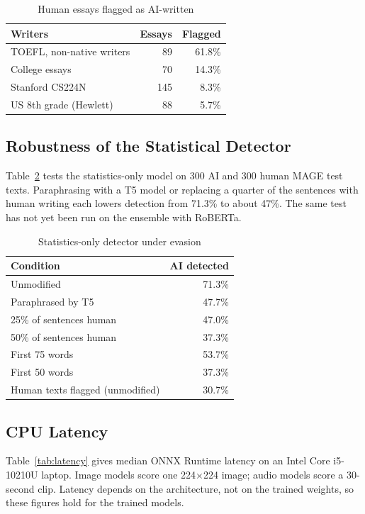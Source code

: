 \documentclass[conference]{IEEEtran}
\begin{document}
\begin{table}[t]
\centering
\caption{Human essays flagged as AI-written}
\label{tab:bias}
\begin{tabular}{lrr}
\toprule
\textbf{Writers} & \textbf{Essays} & \textbf{Flagged} \\
\midrule
TOEFL, non-native writers & 89 & 61.8\% \\
College essays & 70 & 14.3\% \\
Stanford CS224N & 145 & 8.3\% \\
US 8th grade (Hewlett) & 88 & 5.7\% \\
\bottomrule
\end{tabular}
\end{table}

\subsection{Robustness of the Statistical Detector}
Table~\ref{tab:robust} tests the statistics-only model on 300 AI and 300 human MAGE test texts. Paraphrasing with a T5 model or replacing a quarter of the sentences with human writing each lowers detection from 71.3\% to about 47\%. The same test has not yet been run on the ensemble with RoBERTa.

\begin{table}[t]
\centering
\caption{Statistics-only detector under evasion}
\label{tab:robust}
\begin{tabular}{lr}
\toprule
\textbf{Condition} & \textbf{AI detected} \\
\midrule
Unmodified & 71.3\% \\
Paraphrased by T5 & 47.7\% \\
25\% of sentences human & 47.0\% \\
50\% of sentences human & 37.3\% \\
First 75 words & 53.7\% \\
First 50 words & 37.3\% \\
\midrule
Human texts flagged (unmodified) & 30.7\% \\
\bottomrule
\end{tabular}
\end{table}

\subsection{CPU Latency}
Table~\ref{tab:latency} gives median ONNX Runtime latency on an Intel Core i5-10210U laptop. Image models score one 224$\times$224 image; audio models score a 30-second clip. Latency depends on the architecture, not on the trained weights, so these figures hold for the trained models.
\end{document}
